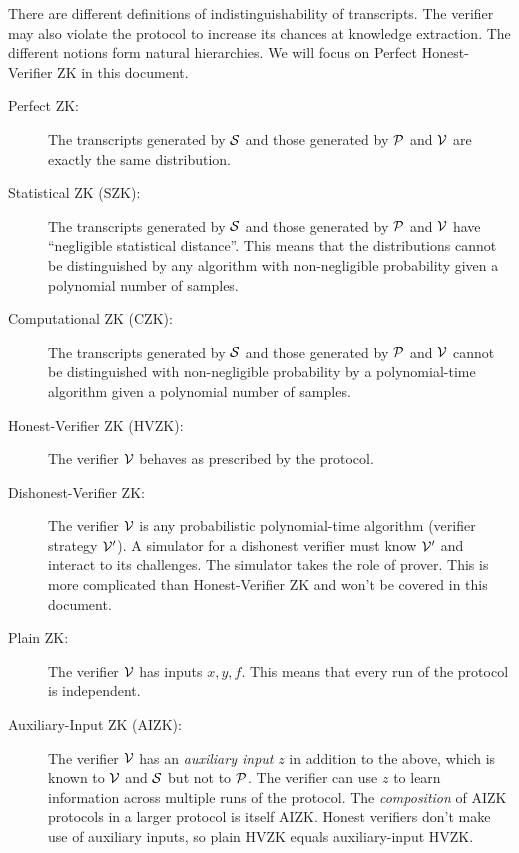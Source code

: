 There are different definitions of indistinguishability of transcripts.
The verifier may also violate the protocol to increase its chances at knowledge extraction.
The different notions form natural hierarchies.
We will focus on Perfect Honest-Verifier ZK in this document.

\begin{description}
    \item[Perfect ZK:]
        The transcripts generated by $\mathcal{S}$ and those generated by $\mathcal{P}$ and $\mathcal{V}$
        are exactly the same distribution.
    \item[Statistical ZK (SZK):]
        The transcripts generated by $\mathcal{S}$ and those generated by $\mathcal{P}$ and $\mathcal{V}$
        have \enquote{negligible statistical distance}.
        This means that the distributions cannot be distinguished by any algorithm with non-negligible probability
        given a polynomial number of samples.
    \item[Computational ZK (CZK):]
        The transcripts generated by $\mathcal{S}$ and those generated by $\mathcal{P}$ and $\mathcal{V}$
        cannot be distinguished with non-negligible probability by a polynomial-time algorithm
        given a polynomial number of samples.
    \item[Honest-Verifier ZK (HVZK):]
        The verifier $\mathcal{V}$ behaves as prescribed by the protocol.
    \item[Dishonest-Verifier ZK:]
        The verifier $\mathcal{V}$ is any probabilistic polynomial-time algorithm (verifier strategy $\mathcal{V}'$).
        A simulator for a dishonest verifier must know $\mathcal{V}'$ and interact to its challenges.
        The simulator takes the role of prover.
        This is more complicated than Honest-Verifier ZK and won't be covered in this document.
    \item[Plain ZK:]
        The verifier $\mathcal{V}$ has inputs $x, y, f$.
        This means that every run of the protocol is independent.
    \item[Auxiliary-Input ZK (AIZK):]
        The verifier $\mathcal{V}$ has an \emph{auxiliary input} $z$ in addition to the above,
        which is known to $\mathcal{V}$ and $\mathcal{S}$ but not to $\mathcal{P}$.
        The verifier can use $z$ to learn information across multiple runs of the protocol.
        The \emph{composition} of AIZK protocols in a larger protocol is itself AIZK.
        Honest verifiers don't make use of auxiliary inputs,
        so plain HVZK equals auxiliary-input HVZK.
\end{description}

